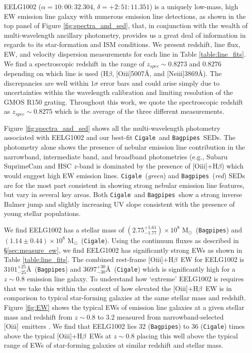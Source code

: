\documentclass[twocolumn,tight,times,linenumbers]{aastex631}
\newcommand{\hbeta}{H$\beta$}
\newcommand{\oiii}{[O{\sc iii}]}
\newcommand{\neiii}{[Ne{\sc iii}]}
\newcommand{\msol}{M$_\odot$}
\newcommand{\cigale}{\texttt{Cigale}}
\newcommand{\bagpipes}{\texttt{Bagpipes}}
\begin{document}
		EELG1002 ($\alpha = 10:00:32.304$, $\delta = +2:51:11.351$) is a uniquely low-mass, high EW emission line galaxy with numerous emission line detections, as shown in the top panel of Figure \ref{fig:spectra_and_sed}, that, in conjunction with the wealth of multi-wavelength ancillary photometry, provides us a great deal of information in regards to its star-formation and ISM conditions. We present redshift, line flux, EW, and velocity dispersion measurements for each line in Table \ref{table:line_fits}. We find a spectroscopic redshift in the range of $z_{spec} \sim 0.8273$ and $0.8276$ depending on which line is used (\hbeta, \oiii5007\AA, and \neiii3869\AA). The discrepancies are well within $1\sigma$ error bars and could arise simply due to uncertainties within the wavelength calibration and limiting resolution of the GMOS R150 grating. Throughout this work, we quote the spectroscopic redshift as $z_{spec} \sim 0.8275$ which is the average of the three different measurements. 
		
		Figure \ref{fig:spectra_and_sed} shows all the multi-wavelength photometry associated with EELG1002 and our best-fit \cigale~and \bagpipes~SEDs. The photometry alone shows the presence of nebular emission line contribution in the narrowband, intermediate band, and broadband photometries (e.g., Subaru SuprimeCam and HSC $z$-band is dominated by the presence of \oiii+\hbeta) which would suggest high EW emission lines. \cigale~(\textit{green}) and \bagpipes~(\textit{red}) SEDs are for the most part consistent in showing strong nebular emission line features, but vary in several key areas. Both \cigale~and \bagpipes~show a strong inverse Balmer jump and slightly increasing UV slope consistent with the presence of young stellar populations.
		
		We find EELG1002 has a stellar mass of $(2.75^{+1.61}_{-1.77}) \times 10^8$ \msol~(\bagpipes) and $(1.14\pm0.44) \times 10^8$ \msol~(\cigale). Using the continuum fluxes as described in \S\ref{sec:measure_ew}, we find EELG1002 has significantly strong EWs as shown in Table \ref{table:line_fits}. The combined rest-frame \oiii+\hbeta~EW for EELG1002 is $3101^{+25}_{-25}$\AA~(\bagpipes) and $3697^{+30}_{-30}$\AA~(\cigale) which is significantly high for a $z \sim 0.8$ emission line galaxy. To understand how `extreme' EELG1002 is requires that we take this within the context of how elevated the \oiii+\hbeta~EW is in comparison to typical star-forming galaxies at the same stellar mass and redshift. Figure \ref{fig:EW} shows the typical EWs of emission line galaxies at a given stellar mass and redshift from $z \sim 0.8$ to $3.2$ measured from narrowband-selected \oiii~emitters \citep{Khostovan2016}. We find that EELG1002 lies 32 (\bagpipes) to 36 (\cigale) times above the typical \oiii+\hbeta~EWs at $z \sim 0.8$ placing this well above the typical range of EWs of star-forming galaxies at similar redshift and stellar mass.
		
\end{document}
